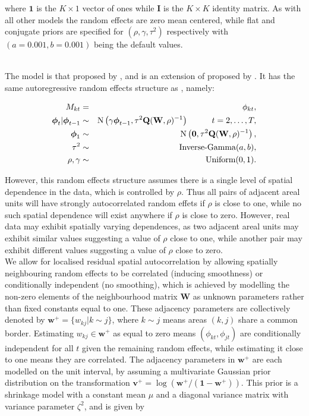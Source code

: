 \documentclass[article,shortnames,nojss]{jss}
\newcommand{\bd}[1]{\ensuremath{\mbox{\boldmath $#1$}}}
\begin{document}
where $\mathbf{1}$ is the $K\times 1$ vector of ones while $\mathbf{I}$ is the $K\times K$ identity matrix. As with all other models the random effects are zero mean centered, while flat and conjugate priors are specified for $(\rho, \gamma, \tau^2)$ respectively with $(a=0.001, b=0.001)$ being the default values.\vspace{1cm}


\\
The model is that proposed by \cite{rushworth2014b}, and is an extension of  proposed by \cite{rushworth2014}. It has the same autoregressive random effects structure as , namely:

\begin{eqnarray}
M_{kt}&=&\phi_{kt},\label{caradaptive1}\\
\bd{\phi}_t|\bd{\phi}_{t-1} & \sim & \mbox{N}\left(\gamma\bd{\phi}_{t-1}, \tau^{2} \mathbf{Q}(\mathbf{W},\rho)^{-1}\right)\hspace{1cm} t=2,\ldots,T,\nonumber\\
\bd{\phi}_1 & \sim & \mbox{N}\left(\mathbf{0}, \tau^{2} \mathbf{Q}(\mathbf{W},\rho)^{-1}\right),\nonumber\\
\tau^2&\sim&\mbox{Inverse-Gamma}(a,b),\nonumber\\
\rho,\gamma&\sim&\mbox{Uniform}(0,1).\nonumber
\end{eqnarray}


However, this random effects structure assumes there is a single level of spatial dependence in the data, which is controlled by $\rho$. Thus all pairs of adjacent areal units will have strongly autocorrelated random effets if $\rho$ is close to one, while no such spatial dependence will exist anywhere if $\rho$ is close to zero. However, real data may exhibit spatially varying dependences, as two adjacent areal units may exhibit similar values suggesting a value of $\rho$ close to one, while another pair may exhibit different values suggesting a value of $\rho$ close to zero.\\

We allow for localised residual spatial autocorrelation by allowing spatially neighbouring  random effects to be correlated (inducing smoothness) or conditionally independent (no smoothing), which is  achieved by modelling the non-zero elements of the neighbourhood matrix $\mathbf{W}$  as unknown parameters rather than fixed constants equal to one. These adjacency parameters are collectively denoted by $\mathbf{w}^{+}=\{w_{kj}|k\sim j\}$, where $k\sim j$ means areas $(k,j)$ share a common border. Estimating $w_{kj}\in\mathbf{w}^{+}$ as equal to zero means $(\phi_{kt}, \phi_{jt})$  are conditionally independent for all $t$  given the remaining random effects, while estimating it close to one means they are correlated. The adjacency parameters in $\mathbf{w}^{+}$ are each modelled on the unit interval, by assuming a multivariate Gaussian prior distribution on the transformation $\mathbf{v}^+ = \log\left(\mathbf{w}^{+}/(\mathbf{1} - \mathbf{w}^{+}) \right)$.  This prior is a shrinkage model with a constant mean $\mu$ and a diagonal variance matrix with variance parameter $\zeta^2$, and is given by
\end{document}
